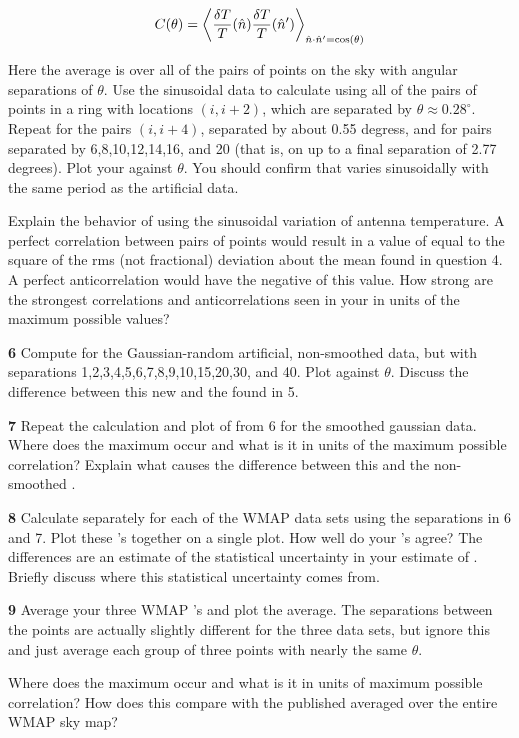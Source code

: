 \documentclass[12pt]{article}
\begin{document}
\[ C(\theta) = \left< \frac{\delta T}{T}(\hat{n})\frac{\delta T}{T}(\hat{n}')\right>_{\hat{n}\cdot\hat{n}'=\cos(\theta)}
\]

Here the average is over all of the pairs of points on the sky with angular separations of \(\theta\). Use the sinusoidal data to calculate \ct using all of the pairs of points in a ring with locations \((i,i+2)\), which are separated by \(\theta \approx 0.28^\circ\). Repeat for the pairs \((i,i+4)\), separated by about 0.55 degress, and for pairs separated by 6,8,10,12,14,16, and 20 (that is, on up to a final separation of 2.77 degrees). Plot your \ct against \(\theta\). You should confirm that \ct varies sinusoidally with the same period as the artificial data.

Explain the behavior of \ct using the sinusoidal variation of antenna temperature. A perfect correlation between pairs of points would result in a value of \ct equal to the square of the rms (not fractional) deviation about the mean found in question 4. A perfect anticorrelation would have the negative of this value. How strong are the strongest correlations and anticorrelations seen in your \ct in units of the maximum possible values?

\textbf{6} Compute \ct for the Gaussian-random artificial, non-smoothed data, but with separations 1,2,3,4,5,6,7,8,9,10,15,20,30, and 40. Plot \ct against \(\theta\). Discuss the difference between this new \ct and the \ct found in 5.

\textbf{7} Repeat the calculation and plot of \ct from 6 for the smoothed gaussian data. Where does the maximum \ct occur and what is it in units of the maximum possible correlation? Explain what causes the difference between this \ct and the non-smoothed \ct.

\textbf{8} Calculate \ct separately for each of the WMAP data sets using the separations in 6 and 7. Plot these \ct's together on a single plot. How well do your \ct's agree? The differences are an estimate of the statistical uncertainty in your estimate of \ct. Briefly discuss where this statistical uncertainty comes from.

\textbf{9} Average your three WMAP \ct's and plot the average. The separations between the points are actually slightly different for the three data sets, but ignore this and just average each group of three points with nearly the same \(\theta\).

Where does the maximum \ct occur and what is it in units of maximum possible correlation? How does this \ct compare with the published \ct averaged over the entire WMAP sky map?
\end{document}

